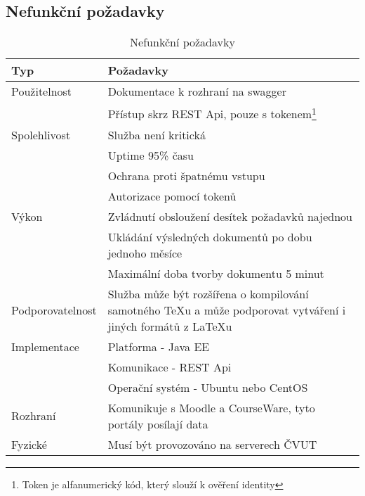  \subsection{Nefunkční požadavky}
 
 \begin{table}[H]
 	\begin{center}
 		\begin{tabular}{ p{4cm} P{8,6cm} }
 			\textbf{Typ} & \textbf{Požadavky} \\
 			\midrule[0,15em]
 			Použitelnost & \tabitem Dokumentace k rozhraní na swagger \footnotemark \\
 						& \tabitem Přístup skrz REST Api, pouze s tokenem\footnote{Token je alfanumerický kód, který slouží k ověření identity}\\
 			\midrule		
 			Spolehlivost & \tabitem Služba není kritická\\
 						& \tabitem Uptime 95\% času\\ 
 						& \tabitem Ochrana proti špatnému vstupu\\
 						& \tabitem Autorizace pomocí tokenů\\
 			\midrule
 			Výkon & \tabitem Zvládnutí obsloužení desítek požadavků najednou\\
 						& \tabitem Ukládání výsledných dokumentů po dobu jednoho měsíce\\
 						& \tabitem Maximální doba tvorby dokumentu 5 minut\\	
			\midrule
			Podporovatelnost & \tabitem Služba může být rozšířena o kompilování samotného TeXu a může podporovat vytváření i jiných formátů z \LaTeX u\\	
			\midrule
			Implementace & \tabitem Platforma - Java EE\\
						& \tabitem Komunikace - REST Api\\
						& \tabitem Operační systém - Ubuntu nebo CentOS\\
			\midrule
 			Rozhraní & \tabitem Komunikuje s Moodle a CourseWare, tyto portály posílají data\\
 			\midrule
 			Fyzické & \tabitem Musí být provozováno na serverech ČVUT\\
 	\end{tabular}
 	\end{center}
 	\caption{Nefunkční požadavky}
 	\label{tab:errors}
 \end{table}
 
